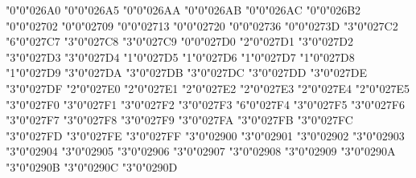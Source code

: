 \mchardef\triangleexclam"0"0"026A0
\mchardef\Hermaphrodite"0"0"026A5
\mchardef\mdwhtcircle"0"0"026AA
\mchardef\mdblkcircle"0"0"026AB
\mchardef\mdsmwhtcircle"0"0"026AC
\mchardef\neuter"0"0"026B2
\mchardef\scissors"0"0"02702
\mchardef\envelope"0"0"02709
\mchardef\checkmark"0"0"02713
\mchardef\maltese"0"0"02720
\mchardef\varstar"0"0"02736
\mchardef\dingasterisk"0"0"0273D
\def\lbrbrak{\delim"4"0"02772 }
\def\rbrbrak{\delim"5"0"02773 }
\mchardef\perp"3"0"027C2
\def\lbag{\delim"4"0"027C5 }
\def\rbag{\delim"5"0"027C6 }
\mchardef\veedot"6"0"027C7
\mchardef\bsolhsub"3"0"027C8
\mchardef\suphsol"3"0"027C9
\mchardef\diamondcdot"0"0"027D0
\mchardef\wedgedot"2"0"027D1
\mchardef\upin"3"0"027D2
\mchardef\pullback"3"0"027D3
\mchardef\pushout"3"0"027D4
\mchardef\leftouterjoin"1"0"027D5
\mchardef\rightouterjoin"1"0"027D6
\mchardef\fullouterjoin"1"0"027D7
\mchardef\bigbot"1"0"027D8
\mchardef\bigtop"1"0"027D9
\mchardef\DashVDash"3"0"027DA
\mchardef\dashVdash"3"0"027DB
\mchardef\multimapinv"3"0"027DC
\mchardef\vlongdash"3"0"027DD
\mchardef\longdashv"3"0"027DE
\mchardef\cirbot"3"0"027DF
\mchardef\lozengeminus"2"0"027E0
\mchardef\concavediamond"2"0"027E1
\mchardef\concavediamondtickleft"2"0"027E2
\mchardef\concavediamondtickright"2"0"027E3
\mchardef\whitesquaretickleft"2"0"027E4
\mchardef\whitesquaretickright"2"0"027E5
\def\lBrack{\delim"4"0"027E6 }
\def\rBrack{\delim"5"0"027E7 }
\def\langle{\delim"4"0"027E8 }
\def\rangle{\delim"5"0"027E9 }
\def\lAngle{\delim"4"0"027EA }
\def\rAngle{\delim"5"0"027EB }
\def\Lbrbrak{\delim"4"0"027EC }
\def\Rbrbrak{\delim"5"0"027ED }
\mchardef\UUparrow"3"0"027F0
\mchardef\DDownarrow"3"0"027F1
\mchardef\acwgapcirclearrow"3"0"027F2
\mchardef\cwgapcirclearrow"3"0"027F3
\mchardef\rightarrowonoplus"6"0"027F4
\let\arrowonoplus\rightarrowonoplus
\mchardef\longleftarrow"3"0"027F5
\mchardef\longrightarrow"3"0"027F6
\mchardef\longleftrightarrow"3"0"027F7
\mchardef\Longleftarrow"3"0"027F8
\mchardef\Longrightarrow"3"0"027F9
\mchardef\Longleftrightarrow"3"0"027FA
\mchardef\longmapsfrom"3"0"027FB
\mchardef\longmapsto"3"0"027FC
\mchardef\Longmapsfrom"3"0"027FD
\mchardef\Longmapsto"3"0"027FE
\mchardef\longrightzigzagarrow"3"0"027FF
\mchardef\nvtwoheadrightarrow"3"0"02900
\mchardef\nVtwoheadrightarrow"3"0"02901
\mchardef\nvLeftarrow"3"0"02902
\mchardef\nvRightarrow"3"0"02903
\mchardef\nvLeftrightarrow"3"0"02904
\mchardef\twoheadmapsto"3"0"02905
\mchardef\Mapsfrom"3"0"02906
\mchardef\Mapsto"3"0"02907
\mchardef\downarrowbarred"3"0"02908
\mchardef\uparrowbarred"3"0"02909
\mchardef\Uuparrow"3"0"0290A
\mchardef\Ddownarrow"3"0"0290B
\mchardef\leftbkarrow"3"0"0290C
\mchardef\rightbkarrow"3"0"0290D
